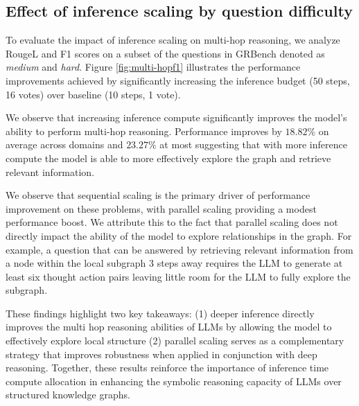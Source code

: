 \subsection{Effect of inference scaling by question difficulty}

To evaluate the impact of inference scaling on multi-hop reasoning, we analyze RougeL and F1 scores on a subset of the questions in GRBench  denoted as {\it medium} and {\it hard}. Figure \ref{fig:multi-hopf1} illustrates the performance improvements achieved by significantly increasing the inference budget (50 steps, 16 votes) over baseline (10 steps, 1 vote). 

We observe that increasing inference compute significantly improves the model's ability to perform multi-hop reasoning. Performance improves by $18.82\%$ on average across domains and $23.27\%$ at most suggesting that with more inference compute the model is able to more effectively explore the graph and retrieve relevant information.

We observe that sequential scaling is the primary driver of performance improvement on these problems, with parallel scaling providing a modest performance boost. We attribute this to the fact that parallel scaling does not directly impact the ability of the model to explore relationships in the graph. For example, a question that can be answered by retrieving relevant information from a node within the local subgraph 3 steps away requires the LLM to generate at least six thought action pairs leaving little room for the LLM to fully explore the subgraph. 

These findings highlight two key takeaways: (1) deeper inference directly improves the multi hop reasoning abilities of LLMs by allowing the model to effectively explore local structure (2) parallel scaling serves as a complementary strategy that improves robustness when applied in conjunction with deep reasoning. Together, these results reinforce the importance of inference time compute allocation in enhancing the symbolic reasoning capacity of LLMs over structured knowledge graphs.






